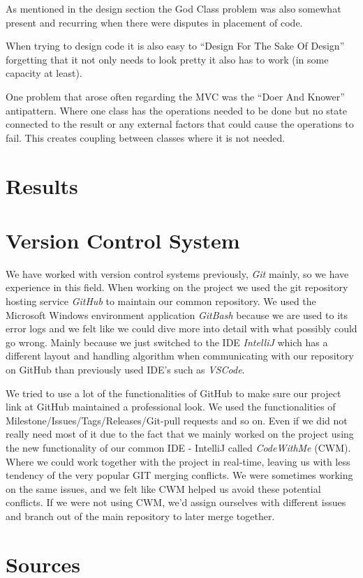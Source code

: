 \documentclass{article}
\begin{document}
As mentioned in the design section the God Class problem was also somewhat present and recurring when there were disputes in placement of code.

When trying to design code it is also easy to “Design For The Sake Of Design” forgetting that it not only needs to look pretty it also has to work (in some capacity at least).

One problem that arose often regarding the MVC was the “Doer And Knower” antipattern. Where one class has the operations needed to be done but no state connected to the result or any external factors that could cause the operations to fail. This creates coupling between classes where it is not needed.




\newpage
\section{Results}

\newpage
\section{Version Control System}
We have worked with version control systems previously, \textit{Git} mainly, so we have experience in this field. When working on the project we used the git repository hosting service \textit{GitHub} to maintain our common repository. We used the Microsoft Windows environment application \textit{GitBash} because we are used to its error logs and we felt like we could dive more into detail with what possibly could go wrong. Mainly because we just switched to the IDE \textit{IntelliJ} which has a different layout and handling algorithm when communicating with our repository on GitHub than previously used IDE’s such as \textit{VSCode}.

We tried to use a lot of the functionalities of GitHub to make sure our project link at GitHub maintained a professional look. We used the functionalities of Milestone/Issues/Tags/Releases/Git-pull requests and so on. Even if we did not really need most of it due to the fact that we mainly worked on the project using the new functionality of our common IDE - IntelliJ called \textit{CodeWithMe} (CWM). Where we could work together with the project in real-time, leaving us with less tendency of the very popular GIT merging conflicts. We were sometimes working on the same issues, and we felt like CWM helped us avoid these potential conflicts.
If we were not using CWM, we’d assign ourselves with different issues and branch out of the main repository to later merge together.


\newpage
\section{Sources}
\end{document}
